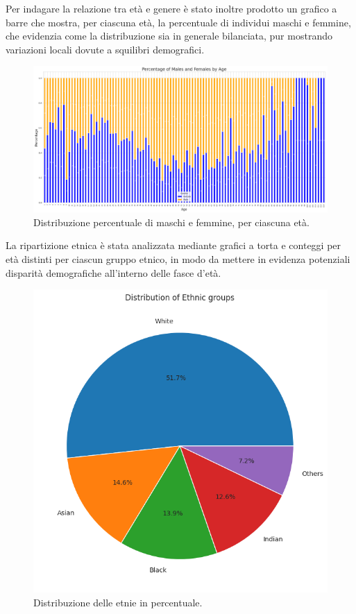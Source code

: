 \documentclass[a4paper,12pt]{report}
\begin{document}
	Per indagare la relazione tra età e genere è stato inoltre prodotto un grafico a barre che mostra, per ciascuna età, la percentuale di individui maschi e femmine, che evidenzia come la distribuzione sia in generale bilanciata, pur mostrando variazioni locali dovute a squilibri demografici.
	
	\begin{figure}[H]
		\centering
		\includegraphics[width=1.0\textwidth]{img/gender_byage_images.png}
		\caption{Distribuzione percentuale di maschi e femmine, per ciascuna età.}
	\end{figure} 
	
	La ripartizione etnica è stata analizzata mediante grafici a torta e conteggi per età distinti per ciascun gruppo etnico, in modo da mettere in evidenza potenziali disparità demografiche all'interno delle fasce d'età. \\
	
	\begin{figure}[H]
		\centering
		\includegraphics[width=1.0\textwidth]{img/pie_ethnic_image.png}
		\caption{Distribuzione delle etnie in percentuale.}
	\end{figure}
	
\end{document}
